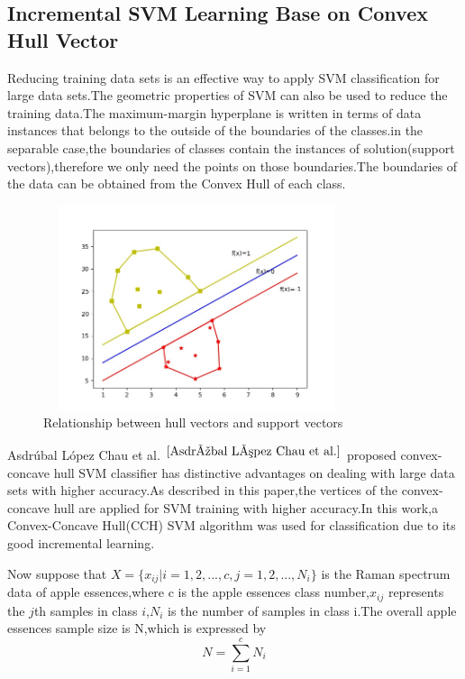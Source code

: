 \documentclass[a4paper]{article}
\begin{document}
\subsection{Incremental SVM Learning Base on Convex Hull Vector}
Reducing training data sets is an effective way to apply SVM classification for large data sets.The geometric properties of SVM can also be used to reduce the training data.The maximum-margin hyperplane is written in terms of data instances that belongs to the outside of the boundaries of the classes.in the separable case,the boundaries of classes contain the instances of solution(support vectors),therefore we only need the points on those boundaries.The boundaries of the data can be obtained from the Convex Hull of each class.




\begin{figure}[h]
  \centering
  \includegraphics[width=9cm,height=6cm]{HullVector_SupportVector}
  \caption{Relationship between hull vectors and support vectors}
\end{figure}
Asdrúbal López Chau et al. $ ^{\cite{Asdrúbal López Chau et al.}}$ proposed convex-concave hull SVM classiﬁer has distinctive advantages on dealing with large data sets with higher accuracy.As described in this paper,the vertices of the convex-concave hull are applied for SVM training with higher accuracy.In this work,a Convex-Concave Hull(CCH) SVM algorithm was used for classification due to its good incremental learning.

Now suppose that $X =\{x_{ij} | i = 1,2,...,c,j=1,2,...,N_i\}$ is the Raman spectrum data of  apple essences,where c is the apple essences class number,$x_{ij}$ represents the $j$th samples in class $i$,$N_i$ is the number of samples in class i.The overall apple essences sample size is N,which is expressed by
$$N = \sum _{i=1} ^{c} N_i$$
\end{document}

